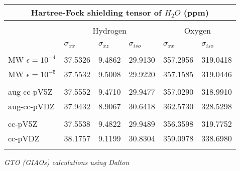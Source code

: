 \begin{frame}
\begin{table}
\centering
\begin{tabular}{l|lll|ll}
\multicolumn{6}{c}{\textbf{Hartree-Fock shielding tensor of $H_2O$ (ppm)}}\\
\hline
\hline
                    &         &         &         &         &         \\
&\multicolumn{3}{|c}{Hydrogen }&\multicolumn{2}{|c}{Oxygen }\\
                    &         &         &         &         &         \\
                    &$\sigma_{xx}$ &$\sigma_{xz}$&$\sigma_{iso}$ 
                    &$\sigma_{xx}$ &$\sigma_{iso}$\\
                    &         &         &         &         &         \\
MW $\epsilon=10^{-4}$  & 37.5326 & 9.4862  & 29.9130 & 357.2956& 319.0418\\
MW $\epsilon=10^{-5}$  & 37.5532 & 9.5008  & 29.9220 & 357.1585& 319.0446\\
                    &         &         &         &         &         \\
aug-cc-pV5Z         & 37.5552 & 9.4710  & 29.9477 & 357.0290& 318.9910\\
aug-cc-pVDZ         & 37.9432 & 8.9067  & 30.6418 & 362.5730& 328.5298\\
       	            &         &         &         &         &         \\
cc-pV5Z	            & 37.5538 & 9.4822  & 29.9489 & 356.3598& 319.7752\\
cc-pVDZ	            & 38.1757 & 9.1199  & 30.8304 & 359.0978& 338.6980\\
       	            &         &         &         &         &         \\
\hline
\hline
\end{tabular}
\end{table}

\it{GTO (GIAOs) calculations using Dalton}

\end{frame}


